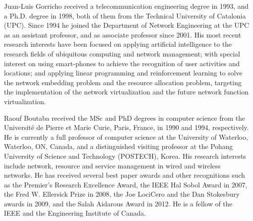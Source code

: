 \documentclass[journal]{IEEEtran}
\begin{document}
\begin{IEEEbiography}
{Juan-Luis Gorricho}
received a telecommunication engineering degree in 1993, and a Ph.D. degree in 1998, both of them from the Technical University of Catalonia (UPC). Since 1994 he joined the Department of Network Engineering at the UPC as an assistant professor, and as associate professor since 2001. His most recent research interests have been focused on applying artificial intelligence to the research fields of ubiquitous computing and network management; with special interest on using smart-phones to achieve the recognition of user activities and locations; and applying linear programming and reinforcement learning to solve the network embedding problem and the resource allocation problem, targeting the implementation of the network virtualization and the future network function virtualization.
\end{IEEEbiography}

\begin{IEEEbiography}
{Raouf Boutaba}
received the MSc and PhD degrees in computer science from the Universit\'{e} de Pierre et Marie Curie, Paris, France, in 1990 and 1994, respectively. He is currently a full professor of computer science at the University of Waterloo, Waterloo, ON, Canada, and a distinguished visiting professor at the Pohang University of Science and Technology (POSTECH), Korea. His research interests include network, resource and service management in wired and wireless networks. He has received several best paper awards and other recognitions such as the Premier's Research Excellence Award, the IEEE Hal Sobol Award in 2007, the Fred W. Ellersick Prize in 2008, the Joe LociCero and the Dan Stokesbury awards in 2009, and the Salah Aidarous Award in 2012. He is a fellow of the IEEE and the Engineering Institute of Canada.
\end{IEEEbiography}
\end{document}
